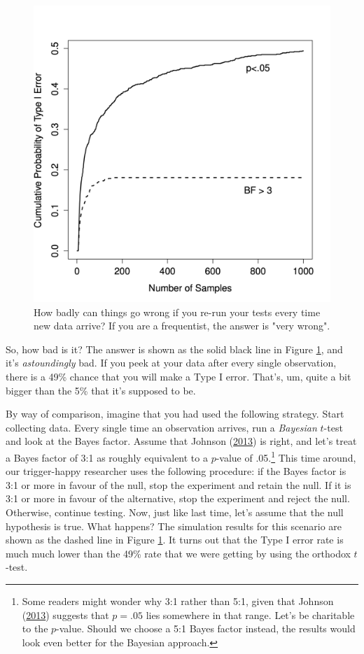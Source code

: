\documentclass[
]{book}
\theoremstyle{definition}
\theoremstyle{definition}
\theoremstyle{definition}
\theoremstyle{definition}
\theoremstyle{remark}
\begin{document}
\begin{figure}

{\centering \includegraphics[width=0.66\linewidth]{resources/image/adapt} 

}

\caption{How badly can things go wrong if you re-run your tests every time new data arrive? If you are a frequentist, the answer is "very wrong".}\label{fig:type1}
\end{figure}

So, how bad is it? The answer is shown as the solid black line in Figure \ref{fig:type1}, and it's \emph{astoundingly} bad. If you peek at your data after every single observation, there is a 49\% chance that you will make a Type I error. That's, um, quite a bit bigger than the 5\% that it's supposed to be.

By way of comparison, imagine that you had used the following strategy. Start collecting data. Every single time an observation arrives, run a \emph{Bayesian} \(t\)-test and look at the Bayes factor. Assume that Johnson (\protect\hyperlink{ref-Johnson2013}{2013}) is right, and let's treat a Bayes factor of 3:1 as roughly equivalent to a \(p\)-value of .05.\footnote{Some readers might wonder why 3:1 rather than 5:1, given that Johnson (\protect\hyperlink{ref-Johnson2013}{2013}) suggests that \(p=.05\) lies somewhere in that range. Let's be charitable to the \(p\)-value. Should we choose a 5:1 Bayes factor instead, the results would look even better for the Bayesian approach.} This time around, our trigger-happy researcher uses the following procedure: if the Bayes factor is 3:1 or more in favour of the null, stop the experiment and retain the null. If it is 3:1 or more in favour of the alternative, stop the experiment and reject the null. Otherwise, continue testing. Now, just like last time, let's assume that the null hypothesis is true. What happens? The simulation results for this scenario are shown as the dashed line in Figure \ref{fig:type1}. It turns out that the Type I error rate is much much lower than the 49\% rate that we were getting by using the orthodox \(t\)-test.
\end{document}
